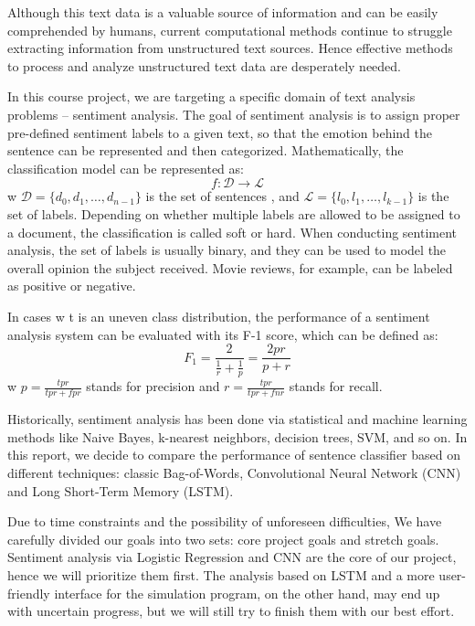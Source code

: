 \documentclass[conference]{IEEEtran}
\begin{document}
    Although this text data is a valuable source of information
    and can be easily comprehended by humans, current computational methods
    continue to struggle extracting information from unstructured text 
    sources.
    Hence effective methods to process and analyze unstructured text data are
    desperately needed.

    In this course project, we are targeting a specific domain of text analysis
    problems -- sentiment analysis. The goal of sentiment analysis is to assign
    proper pre-defined sentiment labels to a given text, so that the emotion behind the
    sentence can be represented and then categorized\cite{allahyari2017brief}.
    Mathematically, the classification model can be represented as:
    $$f:\mathcal{D}\rightarrow\mathcal{L}$$
    w $\mathcal{D}=\{d_0, d_1,\ldots, d_{n-1}\}$ is the set of sentences
    , and $\mathcal{L}=\{l_0, l_1,\ldots, l_{k-1}\}$ is the set of labels.
    Depending on whether multiple labels are allowed to be assigned to a document, the
    classification is called soft or hard\cite{gopal2010multilabel}. When conducting sentiment 
    analysis, the set of labels is usually binary, and they can be used
    to model the overall opinion the subject received. Movie reviews, for example,
    can be labeled as positive or negative\cite{pang2002thumbs}.

    In cases w t is an uneven class distribution, the performance
    of a sentiment analysis system can be evaluated with its
    F-1 score, which can be defined as\cite{forman2003extensive}:
    $$F_1=\frac{2}{\frac{1}{r}+\frac{1}{p}}=\frac{2pr}{p+r}$$
    w $p=\frac{tpr}{tpr+fpr}$ stands for precision and $r=\frac{tpr}{tpr+fnr}$
    stands for recall.

    Historically, sentiment analysis has been done via statistical
    and machine learning methods like Naive Bayes, k-nearest neighbors, decision
    trees, SVM, and so on. In this report, we decide to compare the performance of
    sentence classifier based on different techniques: 
    classic Bag-of-Words\cite{pang2002thumbs},
    Convolutional Neural Network (CNN)\cite{kim2014convolutional} 
    and Long Short-Term Memory (LSTM)\cite{barnes2017assessing}.
    
    Due to time constraints and the possibility of unforeseen difficulties,
    We have carefully divided our goals into 
    two sets: core project goals and stretch goals. Sentiment analysis via 
    Logistic Regression and CNN are the core of our project, hence we will 
    prioritize them first. The analysis based on LSTM and a more
    user-friendly interface for the simulation program, on the other hand,
    may end up with uncertain progress, but we will still try to finish them 
    with our best effort.
    
\end{document}
